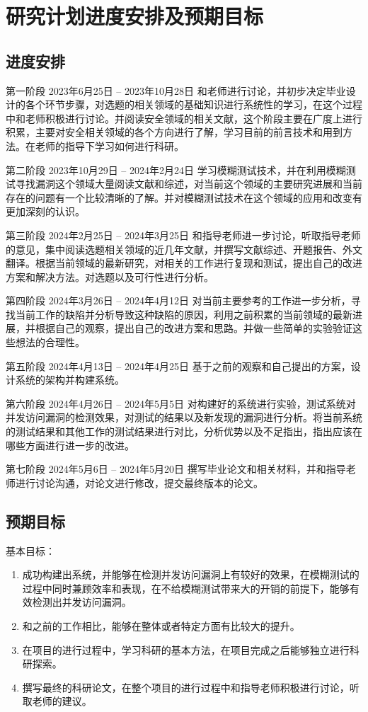 \section{研究计划进度安排及预期目标}

\subsection{进度安排}

第一阶段 2023年6月25日 – 2023年10月28日
和老师进行讨论，并初步决定毕业设计的各个环节步骤，对选题的相关领域的基础知识进行系统性的学习，在这个过程中和老师积极进行讨论。并阅读安全领域的相关文献，这个阶段主要在广度上进行积累，主要对安全相关领域的各个方向进行了解，学习目前的前言技术和用到方法。在老师的指导下学习如何进行科研。

第二阶段 2023年10月29日 – 2024年2月24日
学习模糊测试技术，并在利用模糊测试寻找漏洞这个领域大量阅读文献和综述，对当前这个领域的主要研究进展和当前存在的问题有一个比较清晰的了解。并对模糊测试技术在这个领域的应用和改变有更加深刻的认识。

第三阶段 2024年2月25日 – 2024年3月25日
和指导老师进一步讨论，听取指导老师的意见，集中阅读选题相关领域的近几年文献，并撰写文献综述、开题报告、外文翻译。根据当前领域的最新研究，对相关的工作进行复现和测试，提出自己的改进方案和解决方法。对选题以及可行性进行分析。

第四阶段 2024年3月26日 – 2024年4月12日
对当前主要参考的工作进一步分析，寻找当前工作的缺陷并分析导致这种缺陷的原因，利用之前积累的当前领域的最新进展，并根据自己的观察，提出自己的改进方案和思路。并做一些简单的实验验证这些想法的合理性。

第五阶段 2024年4月13日 – 2024年4月25日
基于之前的观察和自己提出的方案，设计系统的架构并构建系统。

第六阶段 2024年4月26日 – 2024年5月5日
对构建好的系统进行实验，测试系统对并发访问漏洞的检测效果，对测试的结果以及新发现的漏洞进行分析。将当前系统的测试结果和其他工作的测试结果进行对比，分析优势以及不足指出，指出应该在哪些方面进行进一步的改进。

第七阶段 2024年5月6日 – 2024年5月20日
撰写毕业论文和相关材料，并和指导老师进行讨论沟通，对论文进行修改，提交最终版本的论文。

\subsection{预期目标}

基本目标：

\begin{enumerate}
\item 成功构建出系统，并能够在检测并发访问漏洞上有较好的效果，在模糊测试的过程中同时兼顾效率和表现，在不给模糊测试带来大的开销的前提下，能够有效检测出并发访问漏洞。
\item 和之前的工作相比，能够在整体或者特定方面有比较大的提升。
\item 在项目的进行过程中，学习科研的基本方法，在项目完成之后能够独立进行科研探索。
\item 撰写最终的科研论文，在整个项目的进行过程中和指导老师积极进行讨论，听取老师的建议。
\end{enumerate}

